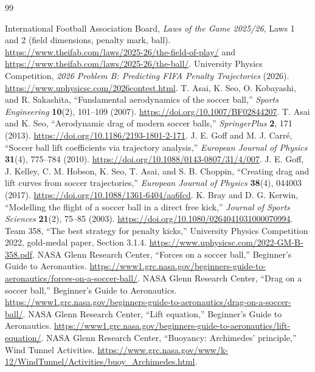 \documentclass[11pt,a4paper]{article}
\begin{document}
\begin{thebibliography}{99}
 International Football Association Board, \emph{Laws of the Game 2025/26}, Laws 1 and 2 (field dimensions, penalty mark, ball). \url{https://www.theifab.com/laws/2025-26/the-field-of-play/} and \url{https://www.theifab.com/laws/2025-26/the-ball/}.
 University Physics Competition, \emph{2026 Problem B: Predicting FIFA Penalty Trajectories} (2026). \url{https://www.uphysicsc.com/2026contest.html}.
 T. Asai, K. Seo, O. Kobayashi, and R. Sakashita, ``Fundamental aerodynamics of the soccer ball,'' \emph{Sports Engineering} \textbf{10}(2), 101--109 (2007). \url{https://doi.org/10.1007/BF02844207}.
 T. Asai and K. Seo, ``Aerodynamic drag of modern soccer balls,'' \emph{SpringerPlus} \textbf{2}, 171 (2013). \url{https://doi.org/10.1186/2193-1801-2-171}.
 J. E. Goff and M. J. Carr\'e, ``Soccer ball lift coefficients via trajectory analysis,'' \emph{European Journal of Physics} \textbf{31}(4), 775--784 (2010). \url{https://doi.org/10.1088/0143-0807/31/4/007}.
 J. E. Goff, J. Kelley, C. M. Hobson, K. Seo, T. Asai, and S. B. Choppin, ``Creating drag and lift curves from soccer trajectories,'' \emph{European Journal of Physics} \textbf{38}(4), 044003 (2017). \url{https://doi.org/10.1088/1361-6404/aa6fcd}.
 K. Bray and D. G. Kerwin, ``Modelling the flight of a soccer ball in a direct free kick,'' \emph{Journal of Sports Sciences} \textbf{21}(2), 75--85 (2003). \url{https://doi.org/10.1080/0264041031000070994}.
 Team 358, ``The best strategy for penalty kicks,'' University Physics Competition 2022, gold-medal paper, Section 3.1.4. \url{https://www.uphysicsc.com/2022-GM-B-358.pdf}.
 NASA Glenn Research Center, ``Forces on a soccer ball,'' Beginner's Guide to Aeronautics. \url{https://www1.grc.nasa.gov/beginners-guide-to-aeronautics/forces-on-a-soccer-ball/}.
 NASA Glenn Research Center, ``Drag on a soccer ball,'' Beginner's Guide to Aeronautics. \url{https://www1.grc.nasa.gov/beginners-guide-to-aeronautics/drag-on-a-soccer-ball/}.
 NASA Glenn Research Center, ``Lift equation,'' Beginner's Guide to Aeronautics. \url{https://www1.grc.nasa.gov/beginners-guide-to-aeronautics/lift-equation/}.
 NASA Glenn Research Center, ``Buoyancy: Archimedes' principle,'' Wind Tunnel Activities. \url{https://www.grc.nasa.gov/www/k-12/WindTunnel/Activities/buoy_Archimedes.html}.

\end{thebibliography}
\end{document}

